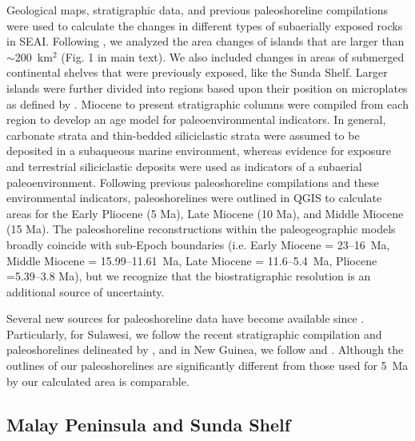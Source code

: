 \documentclass[11pt,letterpaper]{article}
\begin{document}
Geological maps, stratigraphic data, and previous paleoshoreline compilations were used to calculate the changes in different types of subaerially exposed rocks in SEAI. Following \citet{Molnar2015a}, we analyzed the area changes of islands that are larger than $\sim$200~km$^{2}$ (Fig. 1 in main text). We also included changes in areas of submerged continental shelves that were previously exposed, like the Sunda Shelf. Larger islands were further divided into regions based upon their position on microplates as defined by \citet{Matthews2016a}. Miocene to present stratigraphic columns were compiled from each region to develop an age model for paleoenvironmental indicators. In general, carbonate strata and thin-bedded siliciclastic strata were assumed to be deposited in a subaqueous marine environment, whereas evidence for exposure and terrestrial siliciclastic deposits were used as indicators of a subaerial paleoenvironment. Following previous paleoshoreline compilations and these environmental indicators, paleoshorelines were outlined in QGIS to calculate areas for the Early Pliocene (5 Ma), Late Miocene (10 Ma), and Middle Miocene (15 Ma). The paleoshoreline reconstructions within the paleogeographic models broadly coincide with sub-Epoch boundaries (i.e. Early Miocene = 23--16~Ma, Middle Miocene = 15.99--11.61~Ma, Late Miocene = 11.6--5.4~Ma, Pliocene =5.39--3.8 Ma), but we recognize that the biostratigraphic resolution is an additional source of uncertainty.

Several new sources for paleoshoreline data have become available since \citet{Molnar2015a}. Particularly, for Sulawesi, we follow the recent stratigraphic compilation and paleoshorelines delineated by \citet{Nugraha2018a}, and in New Guinea, we follow \citet{Gold2017a} and \citet{Harrington2017a}. Although the outlines of our paleoshorelines are significantly different from those used for 5~Ma by \citet{Molnar2015a} our calculated area is comparable.

\subsection*{Malay Peninsula and Sunda Shelf}
\end{document}
